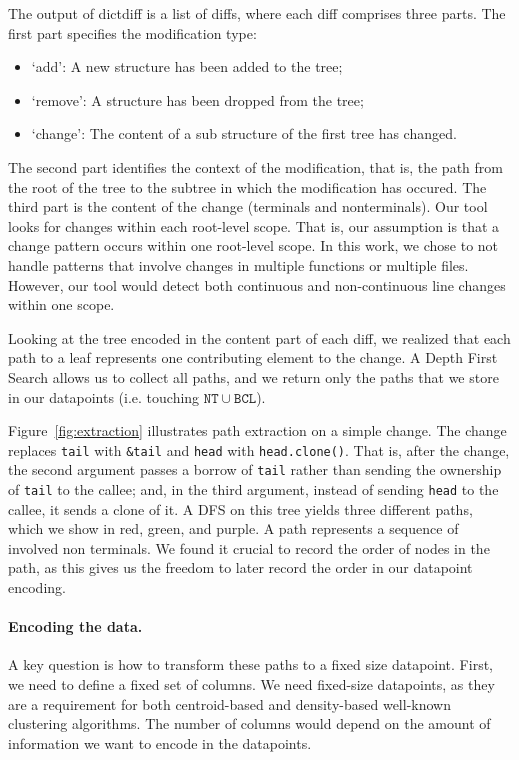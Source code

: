 The output of dictdiff is a list of diffs, where each diff comprises three parts. The first part specifies the modification type:

\begin{itemize}
    \item `add': A new structure has been added to the tree; 
    \item `remove': A structure has been dropped from the tree; 
    \item `change': The content of a sub structure of the first tree has changed.
\end{itemize}

The second part identifies the context of the modification, that is, the path from the root of the tree to the subtree in which the modification has occured. The third part is the content of the change (terminals and nonterminals). Our tool looks for changes within each root-level scope. That is, our assumption is that a change pattern occurs within one root-level scope. In this work, we chose to not handle patterns that involve changes in multiple functions or multiple files. However, our tool would detect both continuous and non-continuous line changes within one scope.

Looking at the tree encoded in the content part of each diff, we realized that each path to a leaf represents one contributing element to the change. A Depth First Search allows us to collect all paths, and we return only the paths that we store in our datapoints (i.e. touching $\mathtt{NT} \cup \mathtt{BCL}$).

Figure~\ref{fig:extraction} illustrates path extraction on a simple change. The change replaces \verb+tail+ with \verb+&tail+ and \verb+head+ with \verb+head.clone()+. That is, after the change, the second argument passes a borrow of \verb+tail+ rather than sending the ownership of \verb+tail+ to the callee; and, in the third argument, instead of sending \verb+head+ to the callee, it sends a clone of it. A DFS on this tree yields three different paths, which we show in red, green, and purple. A path represents a sequence of involved non terminals. We found it crucial to record the order of nodes in the path, as this gives us the freedom to later record the order in our datapoint encoding.

\paragraph{Encoding the data.} A key question is how to transform these paths to a fixed size datapoint. First, we need to define a fixed set of columns. We need fixed-size datapoints, as they are a requirement for both centroid-based and density-based well-known clustering algorithms. The number of columns would depend on the amount of information we want to encode in the datapoints. 

